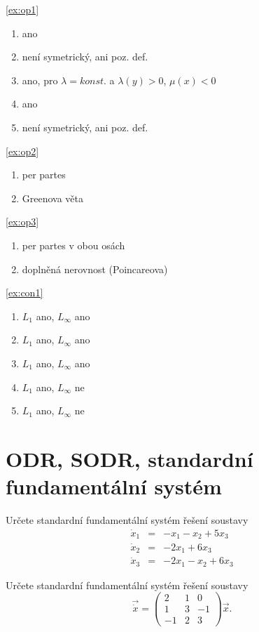 \documentclass[a4paper,10pt]{book}
\begin{document}
\ref{ex:op1}
\begin{enumerate}[label=\alph*), itemsep=-3pt, topsep=-7pt]
  \item ano
  \item není symetrický, ani poz. def.
  \item ano, pro $\lambda=konst.$ a $\lambda(y)>0$, $\mu(x) <0$
  \item ano
  \item není symetrický, ani poz. def.
\end{enumerate}

\ref{ex:op2} 
\begin{enumerate}[label=\alph*), itemsep=-5pt, topsep=-7pt]
  \item per partes
  \item Greenova věta
\end{enumerate}

\ref{ex:op3}
\begin{enumerate}[label=\alph*), itemsep=-5pt, topsep=-7pt]
  \item per partes v obou osách
  \item doplněná nerovnost (Poincareova)
\end{enumerate}

\ref{ex:con1}
\begin{enumerate}[label=\alph*), itemsep=-3pt, topsep=-7pt]
  \item $L_1$ ano, $L_\infty$ ano
  \item $L_1$ ano, $L_\infty$ ano
  \item $L_1$ ano, $L_\infty$ ano
  \item $L_1$ ano, $L_\infty$ ne
  \item $L_1$ ano, $L_\infty$ ne
\end{enumerate}


\chapter{ODR, SODR, standardní fundamentální systém}

\exercise \label{ex:ode1} Určete standardní fundamentální systém řešení soustavy
\begin{eqnarray*}
\dot{x}_1 &=& -x_1  - x_2 + 5x_3 \\
\dot{x}_2 &=& -2x_1       + 6x_3 \\
\dot{x}_3 &=& -2x_1 - x_2 + 6x_3 
\end{eqnarray*}

\exercise \label{ex:ode2} Určete standardní fundamentální systém řešení soustavy
\begin{equation*}
\vec{\dot{x}} = \begin{pmatrix} 2 & 1 & 0 \\ 1 & 3 & -1 \\ -1 & 2 & 3 \end{pmatrix} \vec{x}.
\end{equation*}
\end{document}
